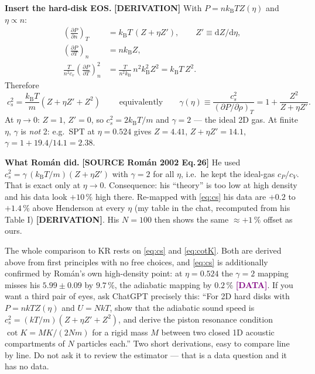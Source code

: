 \documentclass[11pt,a4paper]{article}
\newcommand{\kT}{k_{\mathrm B}T}
\newcommand{\dd}{\mathrm{d}}
\newcommand{\src}[1]{\textcolor{OliveGreen}{\textbf{[SOURCE #1]}}}
\newcommand{\der}{\textcolor{NavyBlue}{\textbf{[DERIVATION]}}}
\newcommand{\dat}{\textcolor{Purple}{\textbf{[DATA]}}}
\begin{document}
\textbf{Insert the hard-disk EOS.} \der{} With $P = n\kT Z(\eta)$ and $\eta \propto n$:
\begin{align}
\left(\frac{\partial P}{\partial n}\right)_{\!T} &= \kT\,(Z + \eta Z'), \qquad Z' \equiv \dd Z/\dd\eta, \\
\left(\frac{\partial P}{\partial T}\right)_{\!n} &= n k_{\mathrm B} Z, \\
\frac{T}{n^2 c_v}\left(\frac{\partial P}{\partial T}\right)_{\!n}^{2} &= \frac{T}{n^2 k_{\mathrm B}}\, n^2 k_{\mathrm B}^2 Z^2 = \kT\, Z^2 .
\end{align}
Therefore
\begin{equation}
\boxed{\;c_s^2 = \frac{\kT}{m}\left(Z + \eta Z' + Z^2\right)\;}
\qquad\text{equivalently}\qquad
\gamma(\eta) \equiv \frac{c_s^2}{(\partial P/\partial\rho)_T} = 1 + \frac{Z^2}{Z + \eta Z'} .
\label{eq:cs}
\end{equation}
At $\eta \to 0$: $Z = 1$, $Z' = 0$, so $c_s^2 = 2\kT/m$ and $\gamma = 2$ --- the ideal 2D gas. At finite $\eta$, $\gamma$ is \emph{not} 2: e.g.\ SPT at $\eta = 0.524$ gives $Z = 4.41$, $Z+\eta Z' = 14.1$, $\gamma = 1 + 19.4/14.1 = 2.38$.

\textbf{What Rom\'an did.} \src{Rom\'an 2002 Eq.\,26} He used $c_s^2 = \gamma\,(\kT/m)(Z+\eta Z')$ with $\gamma = 2$ for all $\eta$, i.e.\ he kept the ideal-gas $c_P/c_V$. That is exact only at $\eta\to0$. Consequence: his ``theory'' is too low at high density and his data look $+10\,\%$ high there. Re-mapped with \eqref{eq:cs} his data are $+0.2$ to $+1.4\,\%$ above Henderson at every $\eta$ (my table in the chat, recomputed from his Table I) \der{}. His $N = 100$ then shows the same $\approx+1\,\%$ offset as ours.

\begin{chk}
The whole comparison to KR rests on \eqref{eq:cs} and \eqref{eq:cotK}. Both are derived above from first principles with no free choices, and \eqref{eq:cs} is additionally confirmed by Rom\'an's own high-density point: at $\eta=0.524$ the $\gamma=2$ mapping misses his $5.99\pm0.09$ by $9.7\,\%$, the adiabatic mapping by $0.2\,\%$ \dat{}. If you want a third pair of eyes, ask ChatGPT precisely this: ``For 2D hard disks with $P = n k T Z(\eta)$ and $U = N k T$, show that the adiabatic sound speed is $c_s^2 = (kT/m)(Z + \eta Z' + Z^2)$, and derive the piston resonance condition $\cot K = MK/(2Nm)$ for a rigid mass $M$ between two closed 1D acoustic compartments of $N$ particles each.'' Two short derivations, easy to compare line by line. Do not ask it to review the estimator --- that is a data question and it has no data.
\end{chk}
\end{document}
